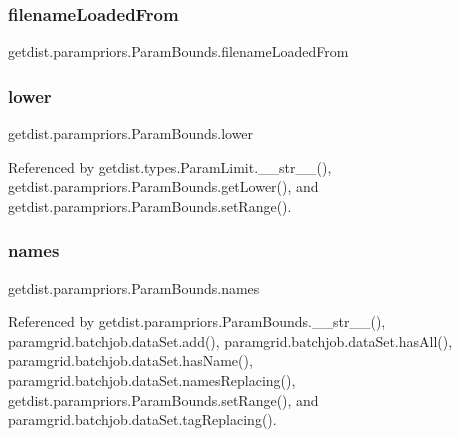 \subsubsection{\texorpdfstring{filename\+Loaded\+From}{filenameLoadedFrom}}
{\footnotesize\ttfamily getdist.\+parampriors.\+Param\+Bounds.\+filename\+Loaded\+From}

\mbox{\label{classgetdist_1_1parampriors_1_1ParamBounds_ab0bb464918cd9910c1c82a662d67782c}} 
\subsubsection{\texorpdfstring{lower}{lower}}
{\footnotesize\ttfamily getdist.\+parampriors.\+Param\+Bounds.\+lower}



Referenced by getdist.\+types.\+Param\+Limit.\+\_\+\+\_\+str\+\_\+\+\_\+(), getdist.\+parampriors.\+Param\+Bounds.\+get\+Lower(), and getdist.\+parampriors.\+Param\+Bounds.\+set\+Range().

\mbox{\label{classgetdist_1_1parampriors_1_1ParamBounds_ad8019f4792977ca787a8e6aa897bce18}} 
\subsubsection{\texorpdfstring{names}{names}}
{\footnotesize\ttfamily getdist.\+parampriors.\+Param\+Bounds.\+names}



Referenced by getdist.\+parampriors.\+Param\+Bounds.\+\_\+\+\_\+str\+\_\+\+\_\+(), paramgrid.\+batchjob.\+data\+Set.\+add(), paramgrid.\+batchjob.\+data\+Set.\+has\+All(), paramgrid.\+batchjob.\+data\+Set.\+has\+Name(), paramgrid.\+batchjob.\+data\+Set.\+names\+Replacing(), getdist.\+parampriors.\+Param\+Bounds.\+set\+Range(), and paramgrid.\+batchjob.\+data\+Set.\+tag\+Replacing().

\mbox{\label{classgetdist_1_1parampriors_1_1ParamBounds_a6ae31a9133ee64da00ee128feaf2a471}} 
